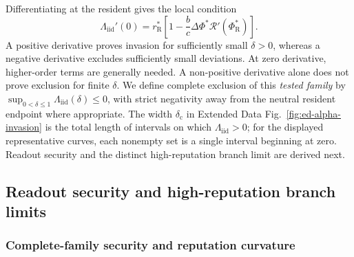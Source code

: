 \documentclass[fleqn,10pt]{wlscirep}
\begin{document}
Differentiating at the resident gives the local condition
\begin{equation}
\Lambda_{\mathrm{iid}}'(0)
=r_{\mathrm R}^*\left[1-\frac bc\Delta\Phi^*\mathcal R'(\Phi_{\mathrm R}^*)\right].
\label{eq:si-iid-local-slope}
\end{equation}
A positive derivative proves invasion for sufficiently small $\delta>0$, whereas a negative derivative excludes sufficiently small deviations. At zero derivative, higher-order terms are generally needed. A non-positive derivative alone does not prove exclusion for finite $\delta$. We define complete exclusion of this \emph{tested family} by $\sup_{0<\delta\leq1}\Lambda_{\mathrm{iid}}(\delta)\leq0$, with strict negativity away from the neutral resident endpoint where appropriate. The width $\delta_{\mathrm c}$ in Extended Data Fig.~\ref{fig:ed-alpha-invasion} is the total length of intervals on which $\Lambda_{\mathrm{iid}}>0$; for the displayed representative curves, each nonempty set is a single interval beginning at zero. Readout security and the distinct high-reputation branch limit are derived next.

\subsection{Readout security and high-reputation branch limits}
\label{sec:si-readout-security}

\subsubsection{Complete-family security and reputation curvature}
\label{sec:si-readout-global}
\end{document}
